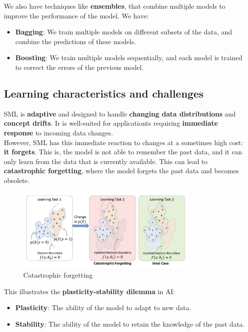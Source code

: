 We also have techniques like \textbf{ensembles}, that combine multiple models to improve
the performance of the model. We have:
\begin{itemize}
    \item \textbf{Bagging}: We train multiple models on different subsets of the data, and
    combine the predictions of these models.
    
    \item \textbf{Boosting}: We train multiple models sequentially, and each model is trained
    to correct the errors of the previous model.
\end{itemize}

\subsection{Learning characteristics and challenges}

SML is \textbf{adaptive} and designed to handle \textbf{changing data distributions} and
\textbf{concept drifts}. Ir is well-suited for applicationts requiring \textbf{immediate 
response} to incoming data changes.\\

However, SML has this immediate reaction to changes at a sometimes high cost: \textbf{it forgets}.
This is, the model is not able to remember the past data, and it can only learn from the
data that is currently available. This can lead to \textbf{catastrophic forgetting}, where
the model forgets the past data and becomes obsolete.

\begin{figure}[H]
    \centering
    \includegraphics[width=0.8\textwidth]{figures/catastrophic_forgetting.png}
    \caption{Catastrophic forgetting}
    \label{fig:catastrophic_forgetting}
\end{figure}

This illustrates the \textbf{plasticity-stability dilemma} in AI:

\begin{itemize}
    \item \textbf{Plasticity}: The ability of the model to adapt to new data.
    \item \textbf{Stability}: The ability of the model to retain the knowledge of the past data.
\end{itemize}

